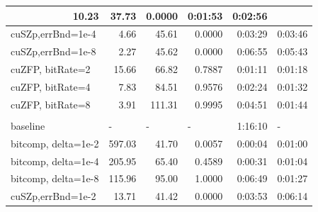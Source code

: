 \documentclass[Ingles]{ic-tese-v3}
\begin{document}
\begin{table}[h!]
\begin{tabular}{|lrrrrr|}
  \multicolumn{1}{r|}{10.23} &
  \multicolumn{1}{r|}{37.73} &
  \multicolumn{1}{r|}{0.0000} &
  \multicolumn{1}{r|}{0:01:53} &
  0:02:56 \\ \hline
\multicolumn{1}{|l|}{cuSZp,errBnd=1e-4} &
  \multicolumn{1}{r|}{4.66} &
  \multicolumn{1}{r|}{45.61} &
  \multicolumn{1}{r|}{0.0000} &
  \multicolumn{1}{r|}{0:03:29} &
  0:03:46 \\ \hline
\multicolumn{1}{|l|}{cuSZp,errBnd=1e-8} &
  \multicolumn{1}{r|}{2.27} &
  \multicolumn{1}{r|}{45.62} &
  \multicolumn{1}{r|}{0.0000} &
  \multicolumn{1}{r|}{0:06:55} &
  0:05:43 \\ \hline
\multicolumn{1}{|l|}{cuZFP, bitRate=2} &
  \multicolumn{1}{r|}{15.66} &
  \multicolumn{1}{r|}{66.82} &
  \multicolumn{1}{r|}{0.7887} &
  \multicolumn{1}{r|}{0:01:11} &
  0:01:18 \\ \hline
\multicolumn{1}{|l|}{cuZFP, bitRate=4} &
  \multicolumn{1}{r|}{7.83} &
  \multicolumn{1}{r|}{84.51} &
  \multicolumn{1}{r|}{0.9576} &
  \multicolumn{1}{r|}{0:02:24} &
  0:01:32 \\ \hline
\multicolumn{1}{|l|}{cuZFP, bitRate=8} &
  \multicolumn{1}{r|}{3.91} &
  \multicolumn{1}{r|}{111.31} &
  \multicolumn{1}{r|}{0.9995} &
  \multicolumn{1}{r|}{0:04:51} &
  0:01:44 \\ \hline
\rowcolor[HTML]{C0C0C0} 
\multicolumn{6}{|l|}{\cellcolor[HTML]{C0C0C0}\textbf{Marmousi3D}} \\ \hline
\multicolumn{1}{|l|}{baseline} &
  \multicolumn{1}{l|}{-} &
  \multicolumn{1}{l|}{-} &
  \multicolumn{1}{l|}{-} &
  \multicolumn{1}{r|}{1:16:10} &
  \multicolumn{1}{l|}{-} \\ \hline
\multicolumn{1}{|l|}{bitcomp, delta=1e-2} &
  \multicolumn{1}{r|}{597.03} &
  \multicolumn{1}{r|}{41.70} &
  \multicolumn{1}{r|}{0.0057} &
  \multicolumn{1}{r|}{0:00:04} &
  0:01:00 \\ \hline
\multicolumn{1}{|l|}{bitcomp, delta=1e-4} &
  \multicolumn{1}{r|}{205.95} &
  \multicolumn{1}{r|}{65.40} &
  \multicolumn{1}{r|}{0.4589} &
  \multicolumn{1}{r|}{0:00:31} &
  0:01:04 \\ \hline
\multicolumn{1}{|l|}{bitcomp, delta=1e-8} &
  \multicolumn{1}{r|}{115.96} &
  \multicolumn{1}{r|}{95.00} &
  \multicolumn{1}{r|}{1.0000} &
  \multicolumn{1}{r|}{0:06:49} &
  0:01:27 \\ \hline
\multicolumn{1}{|l|}{cuSZp,errBnd=1e-2} &
  \multicolumn{1}{r|}{13.71} &
  \multicolumn{1}{r|}{41.42} &
  \multicolumn{1}{r|}{0.0000} &
  \multicolumn{1}{r|}{0:03:53} &
  0:06:14 \\ \hline

\end{tabular}
\end{table}
\end{document}
